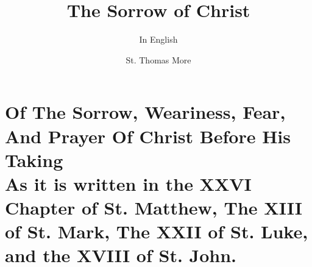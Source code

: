 \documentclass[a4paper,twoside]{scrbook}
\begin{document}
	\title{The Sorrow of Christ}
	\subtitle{In English}
	\author{St. Thomas More}
	\frontmatter
	\maketitle
	\tableofcontents
	\mainmatter
	\part{Of The Sorrow, Weariness, Fear, And Prayer Of Christ Before His Taking\\[\bigskipamount] 
		\large As it is written in the XXVI Chapter of St. Matthew, The XIII of St. Mark, The XXII of St. Luke, and the XVIII of St. John.}
\end{document}
